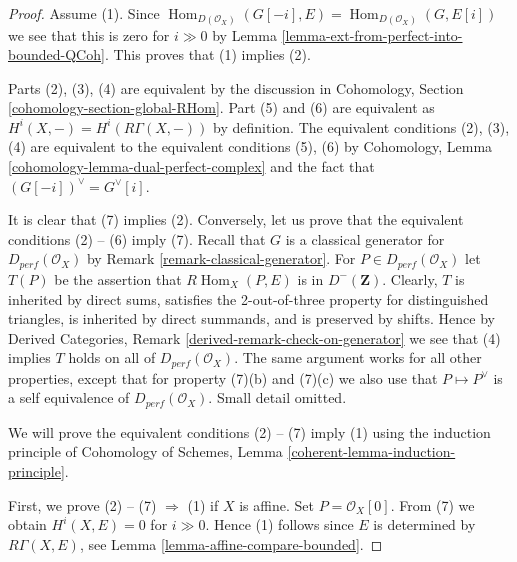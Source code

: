 \documentclass{stacks-project}
\theoremstyle{plain}
\theoremstyle{definition}
\theoremstyle{remark}
\numberwithin{equation}{subsection}
\def\Hom{\mathop{\mathrm{Hom}}\nolimits}
\begin{document}
\begin{proof}
Assume (1). Since
$\Hom_{D(\mathcal{O}_X)}(G[-i], E) = \Hom_{D(\mathcal{O}_X)}(G, E[i])$
we see that this is zero for $i \gg 0$ by
Lemma \ref{lemma-ext-from-perfect-into-bounded-QCoh}. This proves
that (1) implies (2).

\medskip\noindent
Parts (2), (3), (4) are equivalent by the discussion in
Cohomology, Section \ref{cohomology-section-global-RHom}.
Part (5) and (6) are equivalent as $H^i(X, -) = H^i(R\Gamma(X, -))$
by definition. The equivalent conditions (2), (3), (4) are
equivalent to the equivalent conditions (5), (6) by
Cohomology, Lemma \ref{cohomology-lemma-dual-perfect-complex}
and the fact that $(G[-i])^\vee = G^\vee[i]$.

\medskip\noindent
It is clear that (7) implies (2). Conversely, 
let us prove that the equivalent conditions (2) -- (6) imply (7).
Recall that $G$ is a  classical generator for $D_{perf}(\mathcal{O}_X)$ by
Remark \ref{remark-classical-generator}.
For $P \in D_{perf}(\mathcal{O}_X)$ let $T(P)$ be the assertion that
$R\Hom_X(P, E)$ is in $D^-(\mathbf{Z})$.
Clearly, $T$ is inherited by direct sums,
satisfies the 2-out-of-three property for distinguished
triangles, is inherited by direct summands, and is preserved by shifts.
Hence by Derived Categories, Remark \ref{derived-remark-check-on-generator}
we see that (4) implies $T$ holds on all of $D_{perf}(\mathcal{O}_X)$.
The same argument works for all other properties, except that for property
(7)(b) and (7)(c) we also use that $P \mapsto P^\vee$ is a self
equivalence of $D_{perf}(\mathcal{O}_X)$. Small detail omitted.

\medskip\noindent
We will prove the equivalent conditions (2) -- (7) imply (1)
using the induction principle of
Cohomology of Schemes, Lemma \ref{coherent-lemma-induction-principle}.

\medskip\noindent
First, we prove (2) -- (7) $\Rightarrow$ (1) if $X$ is affine.
Set $P = \mathcal{O}_X[0]$. From (7) we obtain $H^i (X, E) = 0$ for $i \gg 0$.
Hence (1) follows since $E$ is determined by $R\Gamma (X, E)$,
see Lemma \ref{lemma-affine-compare-bounded}.


\end{proof}
\end{document}

